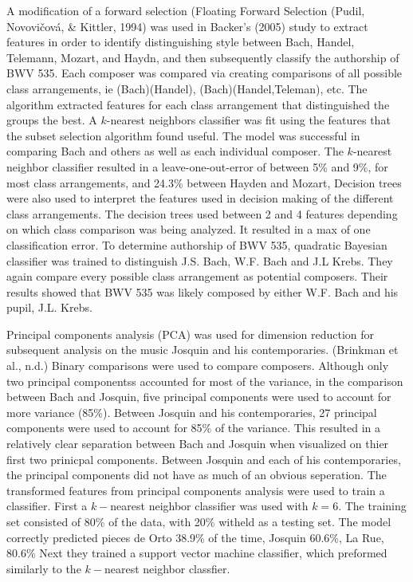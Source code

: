 \documentclass[12pt,twoside]{reedthesis}
\theoremstyle{definition}
\theoremstyle{definition}
\theoremstyle{definition}
\theoremstyle{remark}
\begin{document}
A modification of a forward selection (Floating Forward Selection
(Pudil, Novovičová, \& Kittler, 1994) was used in Backer's (2005) study
to extract features in order to identify distinguishing style between
Bach, Handel, Telemann, Mozart, and Haydn, and then subsequently
classify the authorship of BWV 535. Each composer was compared via
creating comparisons of all possible class arrangements, ie
(Bach)(Handel), (Bach)(Handel,Teleman), etc. The algorithm extracted
features for each class arrangement that distinguished the groups the
best. A \(k\)-nearest neighbors classifier was fit using the features
that the subset selection algorithm found useful. The model was
successful in comparing Bach and others as well as each individual
composer. The \(k\)-nearest neighbor classifier resulted in a
leave-one-out-error of between 5\% and 9\%, for most class arrangements,
and 24.3\% between Hayden and Mozart, Decision trees were also used to
interpret the features used in decision making of the different class
arrangements. The decision trees used between 2 and 4 features depending
on which class comparison was being analyzed. It resulted in a max of
one classification error. To determine authorship of BWV 535, quadratic
Bayesian classifier was trained to distinguish J.S. Bach, W.F. Bach and
J.L Krebs. They again compare every possible class arrangement as
potential composers. Their results showed that BWV 535 was likely
composed by either W.F. Bach and his pupil, J.L. Krebs.

Principal components analysis (PCA) was used for dimension reduction for
subsequent analysis on the music Josquin and his contemporaries.
(Brinkman et al., n.d.) Binary comparisons were used to compare
composers. Although only two principal componentss accounted for most of
the variance, in the comparison between Bach and Josquin, five principal
components were used to account for more variance (85\%). Between
Josquin and his contemporaries, 27 principal components were used to
account for 85\% of the variance. This resulted in a relatively clear
separation between Bach and Josquin when visualized on thier first two
prinicpal components. Between Josquin and each of his contemporaries,
the principal components did not have as much of an obvious seperation.
The transformed features from principal components analysis were used to
train a classifier. First a \(k-\)nearest neighbor classifier was used
with \(k = 6\). The training set consisted of 80\% of the data, with
20\% witheld as a testing set. The model correctly predicted pieces de
Orto 38.9\% of the time, Josquin 60.6\%, La Rue, 80.6\% Next they
trained a support vector machine classifier, which preformed similarly
to the \(k-\)nearest neighbor classfier.
\end{document}
